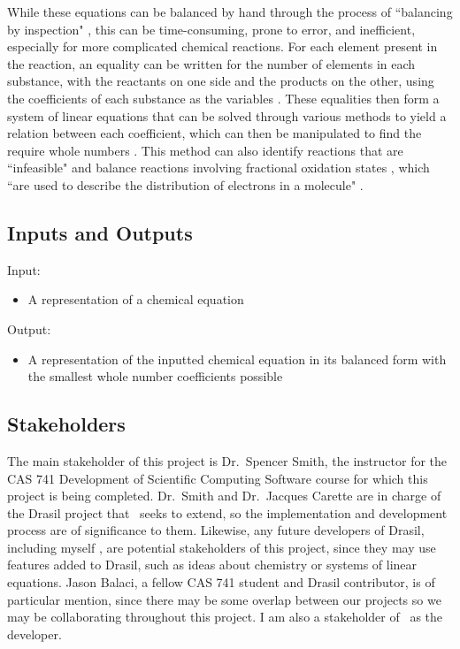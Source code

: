 \documentclass{article}
\begin{document}
While these equations can be balanced by hand through the process of
``balancing by inspection" \cite{lund_introduction_2023}, this can be
time-consuming, prone
to error, and inefficient, especially for more complicated chemical reactions.
For each element present in the reaction, an equality can be written for the
number of elements in each substance, with the reactants on one side and the
products on the other, using the coefficients of each substance as the
variables \cite{hamid_balancing_2019}. These equalities then form a system of
linear
equations that can be solved through various methods to yield a relation
between each coefficient, which can then be manipulated to find the require whole
numbers \cite{lund_introduction_2023, hamid_balancing_2019}. This method can
also identify reactions that are ``infeasible" and balance reactions involving
fractional oxidation states \cite{hamid_balancing_2019}, which ``are used to
describe the distribution of electrons in a molecule"
\cite{unacademy_fractional_2023}.

\subsection{Inputs and Outputs}

\null\newline
\null\newline
\noindent Input:

\begin{itemize}
	\item A representation of a chemical equation
\end{itemize}

\noindent Output:

\begin{itemize}
\item A representation of the inputted chemical equation in its balanced form
with the smallest whole number coefficients possible
\end{itemize}

\subsection{Stakeholders}
The main stakeholder of this project is Dr.~Spencer Smith, the instructor for
the CAS 741 Development of Scientific Computing Software course for which this
project is being completed. Dr.~Smith and Dr.~Jacques Carette are in charge of
the Drasil project that \progname~seeks to extend, so the implementation and
development process are of significance to them. Likewise, any future
developers of Drasil, including myself , are
potential stakeholders of this project, since they may use features added to
Drasil, such as ideas about chemistry or systems of linear equations. Jason
Balaci, a fellow CAS 741 student and Drasil contributor, is of particular 
mention, since
there may be some overlap between our projects so we may be collaborating
throughout this project. I am also a stakeholder of \progname~as the
developer.
\end{document}
